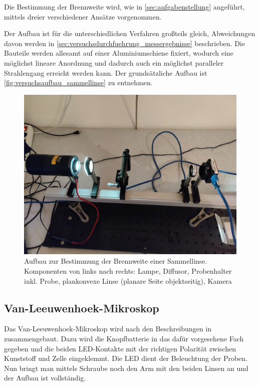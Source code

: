 \documentclass[english, ngerman]{scrartcl}
\begin{document}
Die Bestimmung der Brennweite wird, wie in \autoref{sec:aufgabenstellung} angeführt, mittels dreier verschiedener Ansätze vorgenommen.

Der Aufbau ist für die unterschiedlichen Verfahren großteils gleich, Abweichungen davon werden in \autoref{sec:versuchsdurchfuehrung_messergebnisse} beschrieben. Die Bauteile werden allesamt auf einer Aluminiumschiene fixiert, wodurch eine möglichst lineare Anordnung und dadurch auch ein möglichst paralleler Strahlengang erreicht werden kann.
Der grundsätzliche Aufbau ist \autoref{fig:versuchsaufbau_sammellinse} zu entnehmen.
%
\begin{figure}[H]
    \centering
    \begin{samepage}
        \includegraphics[width=\linewidth]{fig/versuch1.jpeg}
        \caption[Aufbau Brennweite Sammellinse]{Aufbau zur Bestimmung der Brennweite einer Sammellinse. Komponenten von links nach rechts: Lampe, Diffusor, Probenhalter inkl. Probe, plankonvexe Linse (planare Seite objektseitig), Kamera}
        \label{fig:versuchsaufbau_sammellinse}
    \end{samepage}
\end{figure}


\subsection{Van-Leeuwenhoek-Mikroskop}
\label{subsec:versuchsanordnung_vanleeuwenhoek}

Das Van-Leeuwenhoek-Mikroskop wird nach den Beschreibungen in \cite{ref:angabe} zusammengebaut. Dazu wird die Knopfbatterie in das dafür vorgesehene Fach gegeben und die beiden LED-Kontakte mit der richtigen Polarität zwischen Kunststoff und Zelle eingeklemmt. Die LED dient der Beleuchtung der Proben. Nun bringt man mittels Schraube noch den Arm mit den beiden Linsen an und der Aufbau ist vollständig.
\end{document}
